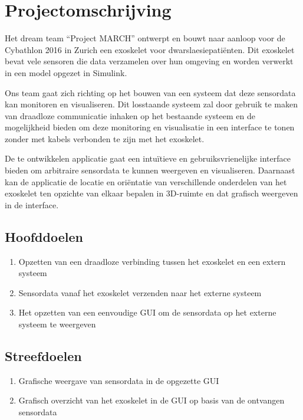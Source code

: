 \section{Projectomschrijving}
Het dream team ``Project MARCH'' ontwerpt en bouwt naar aanloop voor de Cybathlon 2016 in Zurich een exoskelet voor dwarslaesiepatiënten. Dit exoskelet bevat vele sensoren die data verzamelen over hun omgeving en worden verwerkt in een model opgezet in Simulink.

Ons team gaat zich richting op het bouwen van een systeem dat deze sensordata kan monitoren en visualiseren. Dit losstaande systeem zal door gebruik te maken van draadloze communicatie inhaken op het bestaande systeem en de mogelijkheid bieden om deze monitoring en visualisatie in een interface te tonen zonder met kabels verbonden te zijn met het exoskelet.

De te ontwikkelen applicatie gaat een intuïtieve en gebruiksvrienelijke interface bieden om arbitraire sensordata te kunnen weergeven en visualiseren. Daarnaast kan de applicatie de locatie en oriëntatie van verschillende onderdelen van het exoskelet ten opzichte van elkaar bepalen in 3D-ruimte en dat grafisch weergeven in de interface.
\subsection{Hoofddoelen}
\begin{enumerate}
 \item Opzetten van een draadloze verbinding tussen het exoskelet en een extern systeem
 \item Sensordata vanaf het exoskelet verzenden naar het externe systeem
 \item Het opzetten van een eenvoudige GUI om de sensordata op het externe systeem te weergeven
\end{enumerate}
\subsection{Streefdoelen}
\begin{enumerate}
 \item Grafische weergave van sensordata in de opgezette GUI
 \item Grafisch overzicht van het exoskelet in de GUI op basis van de ontvangen sensordata
\end{enumerate}

